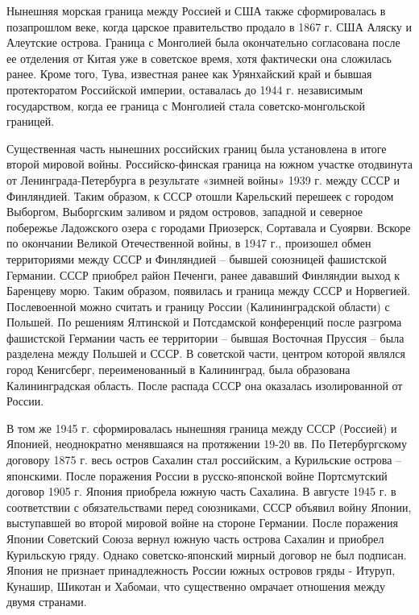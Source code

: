 \documentclass[]{book}
\begin{document}
Нынешняя морская граница между Россией и США также сформировалась в
позапрошлом веке, когда царское правительство продало в 1867 г. США
Аляску и Алеутские острова. Граница с Монголией была окончательно
согласована после ее отделения от Китая уже в советское время, хотя
фактически она сложилась ранее. Кроме того, Тува, известная ранее как
Урянхайский край и бывшая протекторатом Российской империи, оставалась
до 1944 г. независимым государством, когда ее граница с Монголией стала
советско-монгольской границей.

Существенная часть нынешних российских границ была установлена в итоге
второй мировой войны. Российско-финская граница на южном участке
отодвинута от Ленинграда-Петербурга в результате «зимней войны» 1939 г.
между СССР и Финляндией. Таким образом, к СССР отошли Карельский
перешеек с городом Выборгом, Выборгским заливом и рядом островов,
западной и северное побережье Ладожского озера с городами Приозерск,
Сортавала и Суоярви. Вскоре по окончании Великой Отечественной войны, в
1947 г., произошел обмен территориями между СССР и Финляндией -- бывшей
союзницей фашистской Германии. СССР приобрел район Печенги, ранее
дававший Финляндии выход к Баренцеву морю. Таким образом, появилась и
граница между СССР и Норвегией. Послевоенной можно считать и границу
России (Калининградской области) с Польшей. По решениям Ялтинской и
Потсдамской конференций после разгрома фашистской Германии часть ее
территории -- бывшая Восточная Пруссия -- была разделена между Польшей и
СССР. В советской части, центром которой являлся город Кенигсберг,
переименованный в Калининград, была образована Калининградская область.
После распада СССР она оказалась изолированной от России.

В том же 1945 г. сформировалась нынешняя граница между СССР (Россией) и
Японией, неоднократно менявшаяся на протяжении 19-20 вв. По
Петербургскому договору 1875 г. весь остров Сахалин стал российским, а
Курильские острова -- японскими. После поражения России в
русско-японской войне Портсмутский договор 1905 г. Япония приобрела
южную часть Сахалина. В августе 1945 г. в соответствии с обязательствами
перед союзниками, СССР объявил войну Японии, выступавшей во второй
мировой войне на стороне Германии. После поражения Японии Советский
Союза вернул южную часть острова Сахалин и приобрел Курильскую гряду.
Однако советско-японский мирный договор не был подписан. Япония не
признает принадлежность России южных островов гряды - Итуруп, Кунашир,
Шикотан и Хабомаи, что существенно омрачает отношения между двумя
странами.
\end{document}
